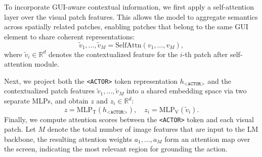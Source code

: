 \documentclass{article}
\begin{document}


To incorporate GUI-aware contextual information, we first apply a self-attention layer over the visual patch features. This allows the model to aggregate semantics across spatially related patches, enabling patches that belong to the same GUI element to share coherent representations:
\begin{equation}
\tilde{v}_1, \dots, \tilde{v}_M = \text{SelfAttn}(v_1, \dots, v_M),
\end{equation}
where $\tilde{v}_i \in \mathbb{R}^d$ denotes the contextualized feature for the $i$-th patch after self-attention module.

Next, we project both the \texttt{<ACTOR>} token representation $h_{\texttt{<ACTOR>}}$ and the contextualized patch features ${\tilde{v}_1, \dots, \tilde{v}_M}$ into a shared embedding space via two separate MLPs,
and obtain $z$ and $z_i \in \mathbb{R}^d$:
\begin{equation}
z = \text{MLP}_{\text{T}}(h_{\texttt{<ACTOR>}}), \quad z_i = \text{MLP}_{\text{V}}(\tilde{v}_i).
\end{equation}
Finally, we compute attention scores between the \texttt{<ACTOR>} token and each visual patch. Let $M$ denote the total number of image features that are input to the LM backbone, the resulting attention weights ${a_1, \dots, a_M}$ form an attention map over the screen, indicating the most relevant region for grounding the action.
\end{document}
